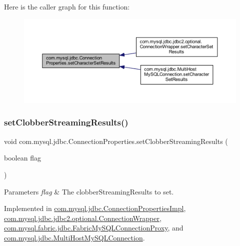 Here is the caller graph for this function\+:\nopagebreak
\begin{figure}[H]
\begin{center}
\leavevmode
\includegraphics[width=350pt]{interfacecom_1_1mysql_1_1jdbc_1_1_connection_properties_a8279ffd124fca779625e5d1d94f32c56_icgraph}
\end{center}
\end{figure}
\mbox{\label{interfacecom_1_1mysql_1_1jdbc_1_1_connection_properties_a3bb976fbcde1b60e4dae84b49320de5f}} 
\subsubsection{\texorpdfstring{set\+Clobber\+Streaming\+Results()}{setClobberStreamingResults()}}
{\footnotesize\ttfamily void com.\+mysql.\+jdbc.\+Connection\+Properties.\+set\+Clobber\+Streaming\+Results (\begin{DoxyParamCaption}\item[{boolean}]{flag }\end{DoxyParamCaption})}


\begin{DoxyParams}{Parameters}
{\em flag} & The clobber\+Streaming\+Results to set. \\
\hline
\end{DoxyParams}


Implemented in \mbox{\hyperlink{classcom_1_1mysql_1_1jdbc_1_1_connection_properties_impl_af52719e3b343f8560ed22d772524d835}{com.\+mysql.\+jdbc.\+Connection\+Properties\+Impl}}, \mbox{\hyperlink{classcom_1_1mysql_1_1jdbc_1_1jdbc2_1_1optional_1_1_connection_wrapper_a89ce1b22b67b5682dd976a11ccae9a3d}{com.\+mysql.\+jdbc.\+jdbc2.\+optional.\+Connection\+Wrapper}}, \mbox{\hyperlink{classcom_1_1mysql_1_1fabric_1_1jdbc_1_1_fabric_my_s_q_l_connection_proxy_ac03f50dfbb5cec1eebaa3be5d0782b15}{com.\+mysql.\+fabric.\+jdbc.\+Fabric\+My\+S\+Q\+L\+Connection\+Proxy}}, and \mbox{\hyperlink{classcom_1_1mysql_1_1jdbc_1_1_multi_host_my_s_q_l_connection_aaa5a94dd2c2c57150920af50503b9764}{com.\+mysql.\+jdbc.\+Multi\+Host\+My\+S\+Q\+L\+Connection}}.

